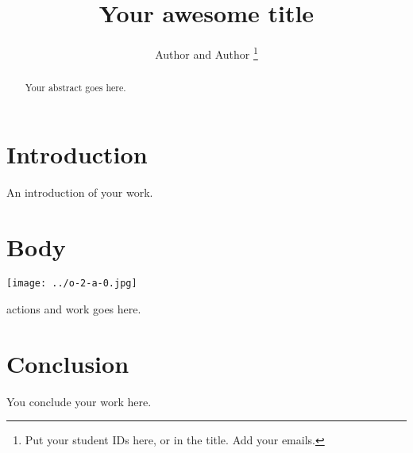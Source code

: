 \documentclass[]{IEEEtran}
\begin{document}
  \title{Your awesome title}
  \author{Author and Author
    \thanks{Put your student IDs here, or in the title.  Add your emails.}
  }
  \maketitle
  
  \begin{abstract}
    Your abstract goes here.
  \end{abstract}
  
  \section{Introduction}
  
  An introduction of your work.


  \section{Body}
  
  \texttt{[image: ../o-2-a-0.jpg]}

  actions and work goes here.
  
  \section{Conclusion}
  
  You conclude your work here.
  
\end{document}
